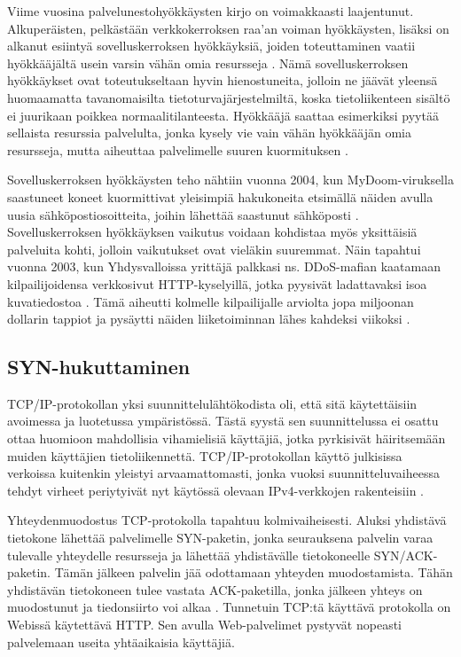 Viime vuosina palvelunestohyökkäysten kirjo on voimakkaasti
laajentunut. Alkuperäisten, pelkästään verkkokerroksen raa’an voiman
hyökkäysten, lisäksi on alkanut esiintyä sovelluskerroksen
hyökkäyksiä, joiden toteuttaminen vaatii hyökkääjältä usein varsin
vähän omia resursseja \cite{Hacking}. Nämä sovelluskerroksen
hyökkäykset ovat toteutukseltaan hyvin hienostuneita, jolloin ne
jäävät yleensä huomaamatta tavanomaisilta tietoturvajärjestelmiltä,
koska tietoliikenteen sisältö ei juurikaan poikkea
normaalitilanteesta. Hyökkääjä saattaa esimerkiksi pyytää sellaista
resurssia palvelulta, jonka kysely vie vain vähän hyökkääjän omia
resursseja, mutta aiheuttaa palvelimelle suuren kuormituksen
\cite{DDOSb}.

Sovelluskerroksen hyökkäysten teho nähtiin vuonna 2004, kun
MyDoom-\-viruksella saastuneet koneet kuormittivat yleisimpiä
hakukoneita etsimällä näiden avulla uusia sähköpostiosoitteita, joihin
lähettää saastunut sähköposti \cite{Hacking}. Sovelluskerroksen
hyökkäyksen vaikutus voidaan kohdistaa myös yksittäisiä palveluita
kohti, jolloin vaikutukset ovat vieläkin suuremmat. Näin tapahtui
vuonna 2003, kun Yhdysvalloissa yrittäjä palkkasi ns. DDoS-mafian
kaatamaan kilpailijoidensa verkkosivut HTTP-kyselyillä, jotka pyysivät
ladattavaksi isoa kuvatiedostoa \cite{DDOSb}. Tämä aiheutti kolmelle
kilpailijalle arviolta jopa miljoonan dollarin tappiot ja pysäytti
näiden liiketoiminnan lähes kahdeksi viikoksi \cite{FBI}.

\subsection{SYN-hukuttaminen}
TCP/IP-protokollan yksi suunnittelulähtökodista oli, että sitä
käytettäisiin avoimessa ja luotetussa ympäristössä. Tästä syystä sen
suunnittelussa ei osattu ottaa huomioon mahdollisia vihamielisiä
käyttäjiä, jotka pyrkisivät häiritsemään muiden käyttäjien
tietoliikennettä. TCP/IP-protokollan käyttö julkisissa verkoissa kuitenkin
yleistyi arvaamattomasti, jonka vuoksi suunnitteluvaiheessa tehdyt
virheet periytyivät nyt käytössä olevaan IPv4-verkkojen rakenteisiin
\cite{Hacking}.

Yhteydenmuodostus TCP-protokolla tapahtuu kolmivaiheisesti. Aluksi
yhdistävä tietokone lähettää palvelimelle SYN-paketin, jonka
seurauksena palvelin varaa tulevalle yhteydelle resursseja ja lähettää
yhdistävälle tietokoneelle SYN/ACK-paketin. Tämän jälkeen palvelin
jää odottamaan yhteyden muodostamista. Tähän yhdistävän tietokoneen
tulee vastata ACK-paketilla, jonka jälkeen yhteys on muodostunut ja
tiedonsiirto voi alkaa \cite{Hacking}. Tunnetuin TCP:tä käyttävä
protokolla on Webissä käytettävä HTTP. Sen avulla Web-palvelimet
pystyvät nopeasti palvelemaan useita yhtäaikaisia käyttäjiä.


